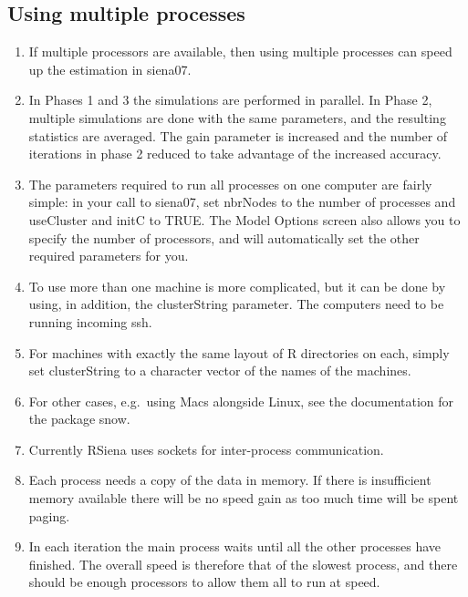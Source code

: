 \documentclass[a4paper,fleqn]{article}
\newcommand{\+}{\, + \,}
\newcommand{\sfn}[1]{\textsf{#1}}
\newcommand{\R}{{\sf R }}
\newcommand{\RS}{{\sf RSiena }}
\begin{document}
{\subsection{Using multiple processes}
\label{S_multipleProcesses}
\begin{enumerate}
\item
If multiple processors are available, then using
multiple processes can speed up the estimation in \sfn{siena07}.

\item In Phases 1 and 3 the simulations are performed in parallel. In Phase 2,
  multiple simulations are done with the same parameters, and the resulting
  statistics are averaged. The gain parameter is increased and the
  number of iterations in phase 2 reduced to take advantage of
  the increased accuracy.

\item The parameters required to run all processes on one computer are fairly
  simple: in your call to \sfn{siena07}, set \sfn{nbrNodes} to the number of
  processes and \sfn{useCluster} and \sfn{initC} to TRUE. The \sfn{Model
    Options} screen also allows you to specify the number of processors, and
  will automatically set the other required parameters for you.

\item To use more than one machine is more complicated, but it can be done by
  using, in addition, the \sfn{clusterString} parameter.  The computers need to
  be running incoming \sfn{ssh}.
\item For machines with exactly the same layout of \R
  directories on each, simply set \sfn{clusterString} to a character vector of
  the names of the machines.
\item For other cases, e.g.\ using Macs alongside Linux,
  see the documentation for the package \sfn{snow}.

\item Currently \RS uses sockets for inter-process communication.
\item Each process needs a copy of the data in memory. If there is insufficient
  memory available there will be no speed gain as too much time will be spent
  paging.
\item In each iteration the main process waits until all the other processes
  have finished. The overall speed is therefore that of the slowest process, and
  there should be enough processors to allow them all to run at speed.
\end{enumerate}

}
\end{document}

